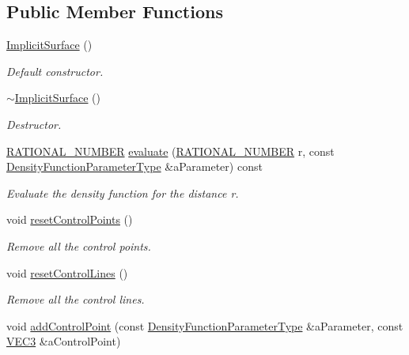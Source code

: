 \subsection*{Public Member Functions}
\begin{DoxyCompactItemize}
\item 
\hyperlink{class_graphics_1_1_implicit_surface_a8da463f9018ca23249504ca32a8ff0fe}{ImplicitSurface} ()
\begin{DoxyCompactList}\small\item\em Default constructor. \end{DoxyCompactList}\item 
\hyperlink{class_graphics_1_1_implicit_surface_a1dfc19dd17f8fa403b17b165fff727ec}{$\sim$ImplicitSurface} ()
\begin{DoxyCompactList}\small\item\em Destructor. \end{DoxyCompactList}\item 
\hyperlink{namespace_utilities_a40969b96bd8d847b962e297cb79f08ce}{RATIONAL\_\-NUMBER} \hyperlink{class_graphics_1_1_implicit_surface_a71bd18c3ae2ceb1cb47a6007f757d57e}{evaluate} (\hyperlink{namespace_utilities_a40969b96bd8d847b962e297cb79f08ce}{RATIONAL\_\-NUMBER} r, const \hyperlink{class_graphics_1_1_implicit_surface_1_1_density_function_parameter_type}{DensityFunctionParameterType} \&aParameter) const 
\begin{DoxyCompactList}\small\item\em Evaluate the density function for the distance r. \end{DoxyCompactList}\item 
void \hyperlink{class_graphics_1_1_implicit_surface_add413648fda72f44300925992bb20973}{resetControlPoints} ()
\begin{DoxyCompactList}\small\item\em Remove all the control points. \end{DoxyCompactList}\item 
void \hyperlink{class_graphics_1_1_implicit_surface_a2ecde6287eccb10ebea9566d08ff9a31}{resetControlLines} ()
\begin{DoxyCompactList}\small\item\em Remove all the control lines. \end{DoxyCompactList}\item 
void \hyperlink{class_graphics_1_1_implicit_surface_a281cd562fc3a7cafc1ca3a921b776591}{addControlPoint} (const \hyperlink{class_graphics_1_1_implicit_surface_1_1_density_function_parameter_type}{DensityFunctionParameterType} \&aParameter, const \hyperlink{class_math_1_1_vec3}{VEC3} \&aControlPoint)

\end{DoxyCompactItemize}
